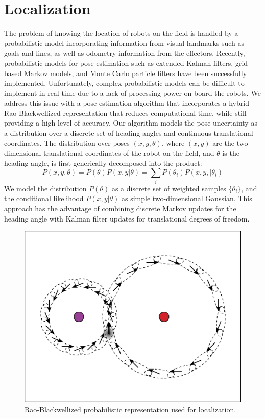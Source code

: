 \documentclass{article}
\begin{document}
\section{Localization}
  The problem of knowing the location of robots on the field is handled by a probabilistic model incorporating information from visual landmarks such as goals and lines, as well as odometry information from the effectors. Recently, probabilistic models for pose estimation such as extended Kalman filters, grid-based Markov models, and Monte Carlo particle filters have been successfully implemented. Unfortunately, complex probabilistic models can be difficult to implement in real-time due to a lack of processing power on board the robots. We address this issue with a pose estimation algorithm that incorporates a hybrid Rao-Blackwellized representation that reduces computational time, while still providing a high level of accuracy. Our algorithm models the pose uncertainty as a distribution over a discrete set of heading angles and continuous translational coordinates. The distribution over poses \((x,y,\theta)\), where \((x,y)\) are the two-dimensional translational coordinates of the robot on the field, and $\theta$ is the heading angle, is first generically decomposed into the product:
	\begin{equation}
		P(x,y,\theta) = P(\theta)P(x,y|\theta) = \sum\limits_{i} P(\theta_{i})P(x,y,|\theta_{i})
	\end{equation}
 	We model the distribution $P(\theta)$ as a discrete set of weighted samples $\{\theta_{i}\}$,	and the conditional likelihood $P(x,y|\theta)$ as simple two-dimensional Gaussian. This approach has the advantage of combining discrete Markov updates for the heading angle with Kalman filter updates for translational degrees of freedom.
  \begin{figure}[H]
		\centering
		\includegraphics[width=.6\textwidth]{figures/RaoBlackwell.eps}
		\caption{Rao-Blackwellized probabilistic representation used for localization.}
		\label{fig:raoblack}
	\end{figure}
 
\end{document}
